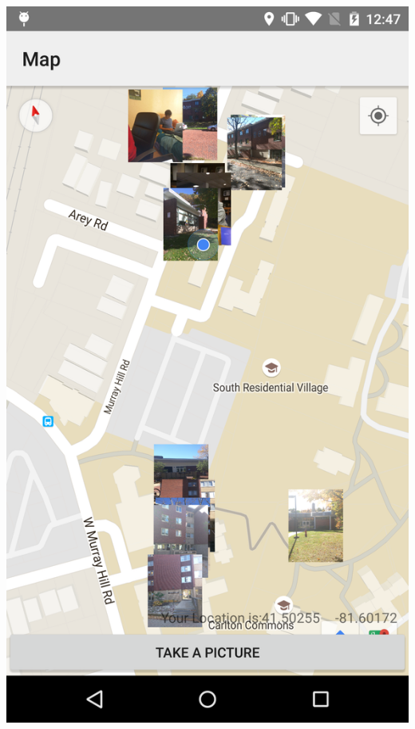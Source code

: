 \documentclass[]{article}
\begin{document}
\includegraphics[keepaspectratio, width=\textwidth]{mapScreenshot}
\end{document}
